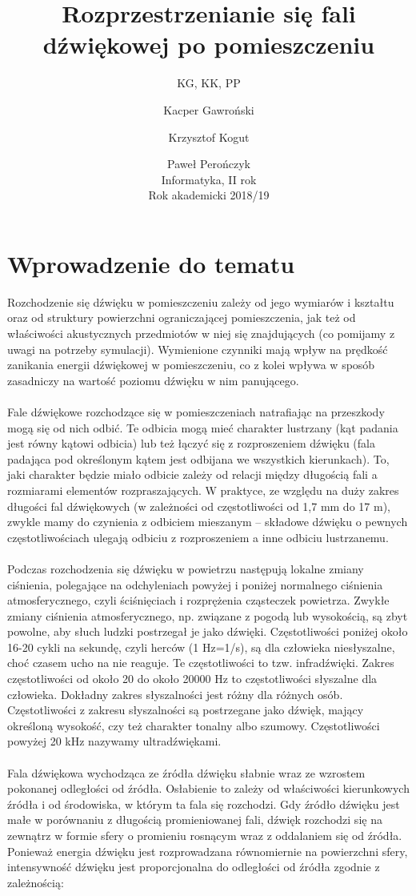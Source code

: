 \documentclass[a4paper, 12pt]{article}
\author{KG, KK, PP}
\title{Rozprzestrzenianie się fali dźwiękowej po pomieszczeniu}
\author{Kacper Gawroński \and Krzysztof Kogut \and Paweł Perończyk \\
		\small Informatyka, II rok \\
		\small Rok akademicki 2018/19 \\
		}
\begin{document}
\maketitle

\section{Wprowadzenie do tematu}

Rozchodzenie się dźwięku w pomieszczeniu zależy od jego wymiarów i kształtu oraz od struktury powierzchni ograniczającej pomieszczenia, jak też od właściwości akustycznych przedmiotów w niej się znajdujących (co pomijamy z uwagi na potrzeby symulacji). Wymienione czynniki mają wpływ na prędkość zanikania energii dźwiękowej w pomieszczeniu, co z kolei wpływa w sposób zasadniczy na wartość poziomu dźwięku w nim panującego. 
\\ \\
Fale dźwiękowe rozchodzące się w pomieszczeniach natrafiając na przeszkody mogą się od nich odbić. Te odbicia mogą mieć charakter lustrzany (kąt padania jest równy kątowi odbicia) lub też łączyć się z rozproszeniem dźwięku (fala padająca pod określonym kątem jest odbijana we wszystkich kierunkach). To, jaki charakter będzie miało odbicie zależy od relacji między długością fali a rozmiarami elementów rozpraszających. W praktyce, ze względu na duży zakres długości fal dźwiękowych (w zależności od częstotliwości od 1,7 mm do 17 m), zwykle mamy do czynienia z odbiciem mieszanym – składowe dźwięku o pewnych częstotliwościach ulegają odbiciu z rozproszeniem a inne odbiciu lustrzanemu. 
\\ \\
Podczas rozchodzenia się dźwięku w powietrzu następują lokalne zmiany ciśnienia, polegające na odchyleniach powyżej i poniżej normalnego ciśnienia atmosferycznego, czyli ściśnięciach i rozprężenia cząsteczek powietrza. Zwykłe zmiany ciśnienia atmosferycznego, np. związane z pogodą lub wysokością, są zbyt powolne, aby słuch ludzki postrzegał je jako dźwięki. Częstotliwości poniżej około 16-20 cykli na sekundę, czyli herców (1 Hz=1/s), są dla człowieka niesłyszalne, choć czasem ucho na nie reaguje. Te częstotliwości to tzw. infradźwięki. Zakres częstotliwości od około 20 do około 20000 Hz to częstotliwości słyszalne dla człowieka. Dokładny zakres słyszalności jest różny dla różnych osób. Częstotliwości z zakresu słyszalności są postrzegane jako dźwięk, mający określoną wysokość, czy też charakter tonalny albo szumowy. Częstotliwości powyżej 20 kHz nazywamy ultradźwiękami. 
\\ \\
Fala dźwiękowa wychodząca ze źródła dźwięku słabnie wraz ze wzrostem pokonanej odległości od źródła. Osłabienie to zależy od właściwości kierunkowych źródła i od środowiska, w którym ta fala się rozchodzi. Gdy źródło dźwięku jest małe w porównaniu z długością promieniowanej fali, dźwięk rozchodzi się na zewnątrz w formie sfery o promieniu rosnącym wraz z oddalaniem się od źródła. Ponieważ energia dźwięku jest rozprowadzana równomiernie na powierzchni sfery, intensywność dźwięku jest proporcjonalna do odległości od źródła zgodnie z zależnością:
\end{document}
